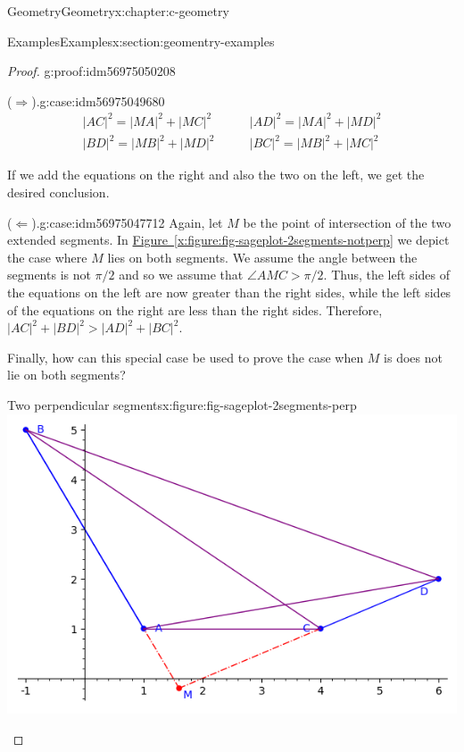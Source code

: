 \documentclass[twoside,10pt,]{book}
\newcommand{\xreffont}{\relax}
\numberwithin{equation}{section}
\newcommand{\gt}{>}
\begin{document}
\begin{chapterptx}{Geometry}{}{Geometry}{}{}{x:chapter:c-geometry}
\begin{sectionptx}{Examples}{}{Examples}{}{}{x:section:geomentry-examples}
\begin{proof}{}{g:proof:idm56975050208}
\begin{case}{}{(\(\Rightarrow\)).}{g:case:idm56975049680}
\begin{equation*}
\begin{split}
\lvert AC\rvert^2 = \lvert MA\rvert^2 +\lvert  MC\rvert^2 
\qquad &\lvert AD\rvert^2 =\lvert  MA\rvert^2 + \lvert MD\rvert^2 \\
\lvert BD\rvert^2 = \lvert MB\rvert^2 +\lvert MD\rvert^2 
\qquad &\lvert BC\rvert^2 = \lvert MB\rvert^2 + \lvert MC\rvert^2
\end{split}
\end{equation*}
%
\par
If we add the equations on the right and also the two on the left, we get the desired conclusion.%
\end{case}
\begin{case}{}{(\(\Leftarrow\)).}{g:case:idm56975047712}
Again, let \(M\) be the point of intersection of the two extended segments.  In  \hyperref[x:figure:fig-sageplot-2segments-notperp]{Figure~{\xreffont\ref{x:figure:fig-sageplot-2segments-notperp}}} we depict the case where \(M\) lies on both segments.  We assume the angle between the segments is not \(\pi/2\) and so we assume that \(\angle AMC \gt \pi/2\).  Thus, the left sides of the equations on the left are now greater than the right sides, while the left sides of the equations on the right are less than the right sides.  Therefore, \(\lvert AC \rvert^2 +  \lvert BD \rvert^2 \gt \lvert AD \rvert^2 + \lvert BC \rvert^2\).%
\par
Finally, how can this special case be used to prove the case when \(M\) is does not lie on both segments?%
\end{case}
\begin{sidebyside}{2}{0}{0}{0}%
\begin{sbspanel}{0.5}%
\begin{figureptx}{Two perpendicular segments}{x:figure:fig-sageplot-2segments-perp}{}%
\includegraphics[width=\linewidth]{images/sageplot-2segments-perp.png}

\end{figureptx}
\end{sbspanel}
\end{sidebyside}
\end{proof}
\end{sectionptx}
\end{chapterptx}
\end{document}
